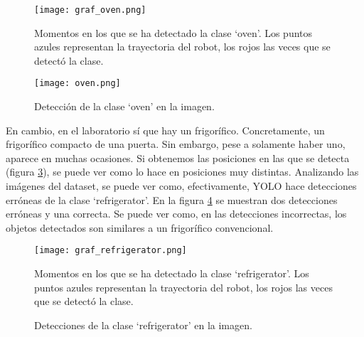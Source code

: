 \begin{figure}[h]
	\begin{center} 
		\texttt{[image: graf\_oven.png]}
	\end{center}
	\caption{Momentos en los que se ha detectado la clase `oven'. Los puntos azules representan la trayectoria del robot, los rojos las veces que se detectó la clase.}
	\label{fig:graf_oven}
\end{figure}

\begin{figure}[h]
	\begin{center} 
		\texttt{[image: oven.png]}
	\end{center}
	\caption{Detección de la clase `oven' en la imagen.}
	\label{fig:det_oven}
\end{figure}

En cambio, en el laboratorio sí que hay un frigorífico. Concretamente, un frigorífico compacto de una puerta. Sin embargo, pese a solamente haber uno, aparece en muchas ocasiones. Si obtenemos las posiciones en las que se detecta (figura \ref{fig:graf_refrigerator}), se puede ver como lo hace en posiciones muy distintas. Analizando las imágenes del dataset, se puede ver como, efectivamente, YOLO hace detecciones erróneas de la clase `refrigerator'. En la figura \ref{fig:det_refrigerator} se muestran dos detecciones erróneas y una correcta. Se puede ver como, en las detecciones incorrectas, los objetos detectados son similares a un frigorífico convencional.\\

\begin{figure}[h]
	\begin{center} 
		\texttt{[image: graf\_refrigerator.png]}
	\end{center}
	\caption{Momentos en los que se ha detectado la clase `refrigerator'. Los puntos azules representan la trayectoria del robot, los rojos las veces que se detectó la clase.}
	\label{fig:graf_refrigerator}
\end{figure}

\begin{figure}[H]
 \centering
  \hspace{0.5cm}
 \caption{Detecciones de la clase `refrigerator' en la imagen.}
 \label{fig:det_refrigerator}
\end{figure}

